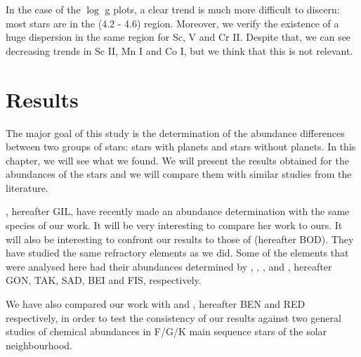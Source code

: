 \documentclass[dvips,12pt,a4paper]{report}
\begin{document}
{{In the case of the $\log$ g plots, a clear trend is much more difficult to discern: most stars are in the (4.2 - 4.6) region. Moreover, we verify the existence of a huge dispersion in the same region for Sc, V and Cr II. Despite that, we can see decreasing trends in Sc II, Mn I and Co I, but we think that this is not relevant. 


\chapter{Results}

The major goal of this study is the determination of the abundance differences between two groups of stars: stars with planets and stars without planets. In this chapter, we will see what we found. We will present the results obtained for the abundances of the stars and we will compare them with similar studies from the literature.

\citet{Gilli-2006}, hereafter GIL, have recently made an abundance determination with the same species of our work. It will be very interesting to compare her work to ours. It will also be interesting to confront our results to those of  \citet{Bodaghee-2003} (hereafter BOD). They have studied the same refractory elements as we did. Some of the elements that were analysed here had their abundances determined by \citet{Gonzalez-2001}, \citet{Takeda-2001},  \citet{Sadakane-2002}, \citet{Beirao-2005} and \citet{Fischer-2005}, hereafter GON, TAK, SAD, BEI and FIS, respectively. 

We have also compared our work with \citet{Bensby-2003} and \citet{Reddy-2003}, hereafter BEN and RED respectively, in order to test the consistency of our results against two general studies of chemical abundances in F/G/K main sequence stars of the solar neighbourhood.

}}
\end{document}
